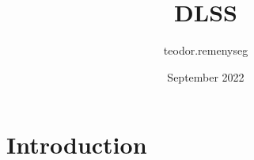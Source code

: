 \documentclass{article}
\title{DLSS}
\author{teodor.remenyseg }
\date{September 2022}
\begin{document}
\maketitle

\section{Introduction}
\end{document}
